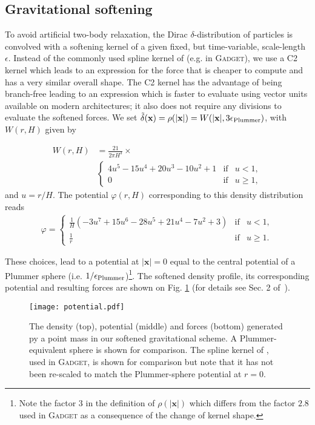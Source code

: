 \subsection{Gravitational softening}
\label{ssec:potential_softening}

To avoid artificial two-body relaxation, the Dirac
$\delta$-distribution of particles is convolved with a softening
kernel of a given fixed, but time-variable, scale-length
$\epsilon$. Instead of the commonly used spline kernel of
\cite{Monaghan1985} (e.g. in \textsc{Gadget}), we use a C2 kernel
\citep{Wendland1995} which leads to an expression for the force that
is cheaper to compute and has a very similar overall shape. The C2
kernel has the advantage of being branch-free leading to an expression
which is faster to evaluate using vector units available on modern
architectures; it also does not require any divisions to evaluate the
softened forces. We set $\tilde\delta(\mathbf{x}) =
\rho(|\mathbf{x}|) = W(|\mathbf{x}|, 3\epsilon_{\rm Plummer})$, with
$W(r, H)$ given by

\begin{align}
W(r,H) &= \frac{21}{2\pi H^3} \times \nonumber \\
&\left\lbrace\begin{array}{rcl}
4u^5 - 15u^4 + 20u^3 - 10u^2 + 1 & \mbox{if} & u < 1,\\
0 & \mbox{if} & u \geq 1,
\end{array}
\right.
\end{align}
and $u = r/H$. The potential $\varphi(r,H)$ corresponding to this density distribution reads
\begin{align}
\varphi = 
\left\lbrace\begin{array}{rcl}
\frac{1}{H} (-3u^7 + 15u^6 - 28u^5 + 21u^4 - 7u^2 + 3) & \mbox{if} & u < 1,\\
\frac{1}{r} & \mbox{if} & u \geq 1.
\end{array}
\right.
\label{eq:fmm:potential}
\end{align}

These choices, lead to a potential at $|\mathbf{x}| = 0$ equal to the
central potential of a Plummer sphere (i.e. $1/\epsilon_{\rm
Plummer}$)\footnote{Note the factor $3$ in the definition of
$\rho(|\mathbf{x}|)$ which differs from the factor $2.8$ used
in \textsc{Gadget} as a consequence of the change of kernel
shape.}. The softened density profile, its corresponding potential and
resulting forces are shown on Fig. \ref{fig:fmm:softening} (for
details see Sec. 2 of~\cite{Price2007}).


\begin{figure}
\texttt{[image: potential.pdf]}
\caption{The density (top), potential (middle) and forces (bottom)
  generated py a point mass in our softened gravitational scheme.
  A Plummer-equivalent sphere is shown for comparison. The spline
  kernel of \citet{Monaghan1985}, used in \textsc{Gadget}, is shown
  for comparison but note that it has not been re-scaled to match the
  Plummer-sphere potential at $r=0$.  %
  }
\label{fig:fmm:softening}
\end{figure}
